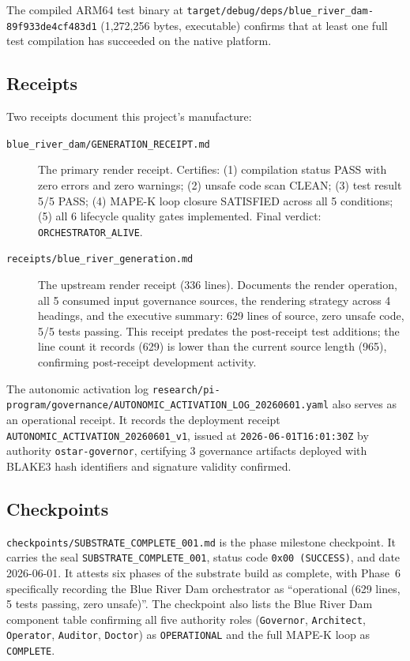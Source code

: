 The compiled ARM64 test binary at
\texttt{target/debug/deps/blue\_river\_dam-89f933de4cf483d1}
(1{,}272{,}256 bytes, executable) confirms that at least one full test
compilation has succeeded on the native platform.

\subsection{Receipts}
\label{sec:blue-river-dam-evidence-receipts}

Two receipts document this project's manufacture:

\begin{description}
  \item[\texttt{blue\_river\_dam/GENERATION\_RECEIPT.md}] The primary render
    receipt. Certifies: (1) compilation status PASS with zero errors and zero
    warnings; (2) unsafe code scan CLEAN; (3) test result 5/5 PASS; (4) MAPE-K
    loop closure SATISFIED across all 5 conditions; (5) all 6 lifecycle quality
    gates implemented. Final verdict: \texttt{ORCHESTRATOR\_ALIVE}.
  \item[\texttt{receipts/blue\_river\_generation.md}] The upstream render receipt
    (336 lines). Documents the render operation, all 5 consumed input governance
    sources, the rendering strategy across 4 headings, and the executive summary:
    629 lines of source, zero unsafe code, 5/5 tests passing. This receipt
    predates the post-receipt test additions; the line count it records (629)
    is lower than the current source length (965), confirming post-receipt
    development activity.
\end{description}

The autonomic activation log
\texttt{research/pi-program/governance/AUTONOMIC\_ACTIVATION\_LOG\_20260601.yaml}
also serves as an operational receipt. It records the deployment receipt
\texttt{AUTONOMIC\_ACTIVATION\_20260601\_v1}, issued at
\texttt{2026-06-01T16:01:30Z} by authority \texttt{ostar-governor}, certifying
3 governance artifacts deployed with BLAKE3 hash identifiers and signature
validity confirmed.

\subsection{Checkpoints}
\label{sec:blue-river-dam-evidence-checkpoints}

\texttt{checkpoints/SUBSTRATE\_COMPLETE\_001.md} is the phase milestone
checkpoint. It carries the seal \texttt{SUBSTRATE\_COMPLETE\_001}, status code
\texttt{0x00 (SUCCESS)}, and date 2026-06-01. It attests six phases of the
substrate build as complete, with Phase~6 specifically recording the Blue River
Dam orchestrator as ``operational (629 lines, 5 tests passing, zero unsafe)''.
The checkpoint also lists the Blue River Dam component table confirming all five
authority roles (\texttt{Governor}, \texttt{Architect}, \texttt{Operator},
\texttt{Auditor}, \texttt{Doctor}) as \texttt{OPERATIONAL} and the full MAPE-K
loop as \texttt{COMPLETE}.

